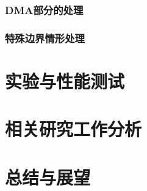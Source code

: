 \subsubsection{DMA部分的处理}

\subsubsection{特殊边界情形处理}



\section{实验与性能测试}



\section{相关研究工作分析}



\section{总结与展望}
